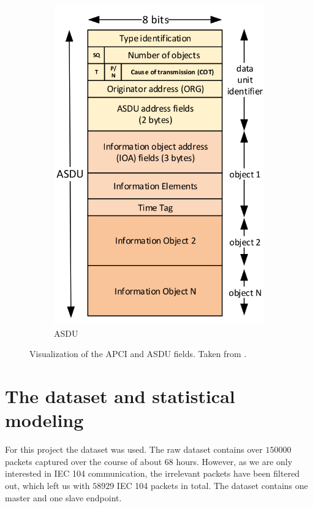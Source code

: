 \begin{figure}
\begin{subfigure}[b]{0.3\textwidth}
    \includegraphics[width=\textwidth]{obrazky-figures/asdu.png}
    \caption{ASDU}
    \label{fig:ASDU}
  \end{subfigure}
  \caption{Visualization of the APCI and ASDU fields. Taken from \cite{IEC104}.}
  \label{fig:packet_structure}
\end{figure}

\section{The dataset and statistical modeling}
For this project the  dataset was used. The raw dataset contains over $150000$ packets captured over the course of
about $68$ hours. However, as we are only interested in IEC 104 communication, the irrelevant packets have been filtered out, which left us
with $58929$ IEC 104 packets in total. The dataset contains one master and one slave endpoint.

